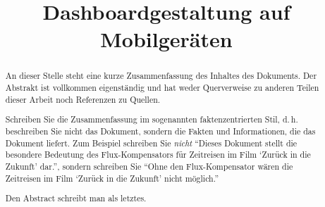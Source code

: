 \documentclass[conference,compsoc,final,a4paper]{IEEEtran}
\newcommand{\autoren}[0]{Wittmann, Yan}
\newcommand{\dokumententitel}[0]{Dashboardgestaltung auf Mobilgeräten}
\begin{document}
    \title{\dokumententitel}

    \author{
        \IEEEauthorblockN{\autoren}
    }

    \maketitle
    \thispagestyle{plain}
    \pagestyle{plain}


    \begin{abstract}
        An dieser Stelle steht eine kurze Zusammenfassung des Inhaltes des Dokuments. Der Abstrakt ist vollkommen eigenständig und hat weder Querverweise zu anderen Teilen dieser Arbeit noch Referenzen zu Quellen.

        Schreiben Sie die Zusammenfassung im sogenannten faktenzentrierten Stil, d.\,h. beschreiben Sie nicht das Dokument, sondern die Fakten und Informationen, die das Dokument liefert. Zum Beispiel schreiben Sie \textit{nicht} \enquote{Dieses Dokument stellt die besondere Bedeutung des Flux-Kompensators für Zeitreisen im Film \enquote{Zurück in die Zukunft} dar.}, sondern schreiben Sie \enquote{Ohne den Flux-Kompensator wären die Zeitreisen im Film \enquote{Zurück in die Zukunft} nicht möglich.}

        Den Abstract schreibt man als letztes.
    \end{abstract}

    \small\tableofcontents

\end{document}
